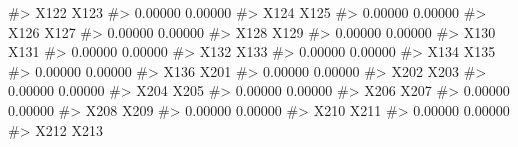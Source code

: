 \documentclass[
  letterpaper,
]{krantz}
\makeatletter
\newenvironment{Shaded}{\begin{snugshade}}{\end{snugshade}}
\newcommand{\CommentTok}[1]{\textcolor[rgb]{0.37,0.37,0.37}{#1}}
\newenvironment{kframe}{%
\medskip{}
\setlength{\fboxsep}{.8em}
 \def\at@end@of@kframe{}%
 \ifinner\ifhmode%
  \def\at@end@of@kframe{\end{minipage}}%
  \begin{minipage}{\columnwidth}%
 \fi\fi%
 \def\FrameCommand##1{\hskip\@totalleftmargin \hskip-\fboxsep
 \colorbox{shadecolor}{##1}\hskip-\fboxsep
     \hskip-\linewidth \hskip-\@totalleftmargin \hskip\columnwidth}%
 \MakeFramed {\advance\hsize-\width
   \@totalleftmargin\z@ \linewidth\hsize
   \@setminipage}}%
 {\par\unskip\endMakeFramed%
 \at@end@of@kframe}
\renewenvironment{Shaded}{\begin{kframe}}{\end{kframe}}
\makeatother
\begin{document}
\begin{Shaded}
\begin{Highlighting}[]
\CommentTok{\#\textgreater{}                             X122                             X123 }
\CommentTok{\#\textgreater{}                          0.00000                          0.00000 }
\CommentTok{\#\textgreater{}                             X124                             X125 }
\CommentTok{\#\textgreater{}                          0.00000                          0.00000 }
\CommentTok{\#\textgreater{}                             X126                             X127 }
\CommentTok{\#\textgreater{}                          0.00000                          0.00000 }
\CommentTok{\#\textgreater{}                             X128                             X129 }
\CommentTok{\#\textgreater{}                          0.00000                          0.00000 }
\CommentTok{\#\textgreater{}                             X130                             X131 }
\CommentTok{\#\textgreater{}                          0.00000                          0.00000 }
\CommentTok{\#\textgreater{}                             X132                             X133 }
\CommentTok{\#\textgreater{}                          0.00000                          0.00000 }
\CommentTok{\#\textgreater{}                             X134                             X135 }
\CommentTok{\#\textgreater{}                          0.00000                          0.00000 }
\CommentTok{\#\textgreater{}                             X136                             X201 }
\CommentTok{\#\textgreater{}                          0.00000                          0.00000 }
\CommentTok{\#\textgreater{}                             X202                             X203 }
\CommentTok{\#\textgreater{}                          0.00000                          0.00000 }
\CommentTok{\#\textgreater{}                             X204                             X205 }
\CommentTok{\#\textgreater{}                          0.00000                          0.00000 }
\CommentTok{\#\textgreater{}                             X206                             X207 }
\CommentTok{\#\textgreater{}                          0.00000                          0.00000 }
\CommentTok{\#\textgreater{}                             X208                             X209 }
\CommentTok{\#\textgreater{}                          0.00000                          0.00000 }
\CommentTok{\#\textgreater{}                             X210                             X211 }
\CommentTok{\#\textgreater{}                          0.00000                          0.00000 }
\CommentTok{\#\textgreater{}                             X212                             X213 }

\end{Highlighting}
\end{Shaded}
\end{document}
